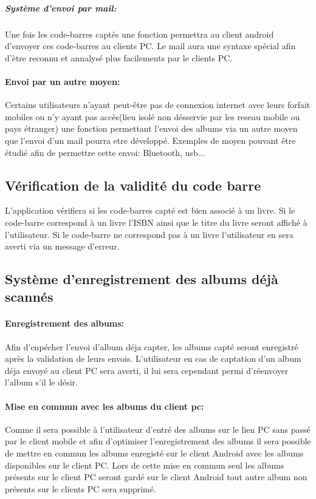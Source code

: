 \subparagraph{Système d'envoi par mail:}
Une fois les code-barres captés une fonction permettra au client android d'envoyer ces code-barres au clients PC. 
Le mail aura une syntaxe spécial afin d'ètre reconnu et annalysé plus facilements par le clients PC. 

\paragraph{Envoi par un autre moyen:}
Certains utilisateurs n'ayant peut-être pas de connexion internet avec leurs forfait mobiles ou n'y ayant pas accès(lieu isolé non désservie par les reseau mobile ou pays étranger) une fonction permettant l'envoi des albums via un autre moyen que l'envoi d'un mail pourra etre développé.
Exemples de moyen pouvant être étudié afin de permettre cette envoi: Bluetooth, usb...

\subsection{Vérification de la validité du code barre}
L'application vérifiera si les code-barres capté est bien associé à un livre.
Si le code-barre correspond à un livre l'ISBN ainsi que le titre du livre seront affiché à l'utilisateur.
Si le code-barre ne correspond pas à un livre l'utilisateur en sera averti via un message d'erreur.

\subsection{Système d'enregistrement des albums déjà scannés}
\paragraph{Enregistrement des albums:} 
Afin d'enpécher l'envoi d'album déja capter, les albums capté seront enregistré après la validation de leurs envois. 
L'utilisateur en cas de captation d'un album déja envoyé au client PC sera averti, il lui sera cependant permi d'réenvoyer l'album s'il le désir.

\paragraph{Mise en commun avec les albums du client pc:} 
Comme il sera possible à l'utilisateur d'entré des albums sur le lien PC sans passé par le client mobile et afin d'optimiser l'enregistrement des albums il sera possible de mettre en commun les albums enregisté sur le client Android avec les albums disponibles sur le client PC.
Lors de cette mise en commun seul les albums présents sur le client PC seront gardé sur le client Android tout autre album non présents sur le clients PC sera supprimé.  

